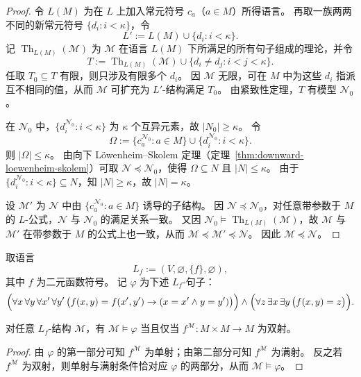 \documentclass[lang=cn,a4paper,newtx,section]{elegantbook}
\begin{document}
 \begin{proof}
 令 $L(M)$ 为在 $L$ 上加入常元符号 $c_a$（$a\in M$）所得语言。
 再取一族两两不同的新常元符号 $\{d_i:i<\kappa\}$，令
 \[
   L':=L(M)\cup\{d_i:i<\kappa\}.
 \]
 记 $\operatorname{Th}_{L(M)}(\mathcal M)$ 为 $\mathcal M$ 在语言 $L(M)$ 下所满足的所有句子组成的理论，并令
 \[
   T:=\operatorname{Th}_{L(M)}(\mathcal M)\cup\{d_i\neq d_j: i<j<\kappa\}.
 \]
 任取 $T_0\subseteq T$ 有限，则只涉及有限多个 $d_i$。
 因 $\mathcal M$ 无限，可在 $M$ 中为这些 $d_i$ 指派互不相同的值，从而 $\mathcal M$ 可扩充为 $L'$-结构满足 $T_0$。
 由紧致性定理，$T$ 有模型 $\mathcal N_0$。

 在 $\mathcal N_0$ 中，$\{d_i^{\mathcal N_0}:i<\kappa\}$ 为 $\kappa$ 个互异元素，故 $\lvert N_0\rvert\ge\kappa$。
 令
 \[
   \Omega:=\{c_a^{\mathcal N_0}:a\in M\}\cup\{d_i^{\mathcal N_0}:i<\kappa\}.
 \]
 则 $\lvert\Omega\rvert\le\kappa$。
 由向下 Löwenheim--Skolem 定理（定理~\ref{thm:downward-loewenheim-skolem}）可取 $\mathcal N\preccurlyeq\mathcal N_0$，使得 $\Omega\subseteq N$ 且 $\lvert N\rvert\le\kappa$。
 由于 $\{d_i^{\mathcal N_0}:i<\kappa\}\subseteq N$，知 $\lvert N\rvert\ge\kappa$，故 $\lvert N\rvert=\kappa$。

 设 $\mathcal M'$ 为 $\mathcal N$ 中由 $\{c_a^{\mathcal N_0}:a\in M\}$ 诱导的子结构。
 因 $\mathcal N\preccurlyeq\mathcal N_0$，对任意带参数于 $M$ 的 $L$-公式，$\mathcal N$ 与 $\mathcal N_0$ 的满足关系一致。
 又因 $\mathcal N_0\models\operatorname{Th}_{L(M)}(\mathcal M)$，故 $\mathcal M$ 与 $\mathcal M'$ 在带参数于 $M$ 的公式上也一致，从而 $\mathcal M\preccurlyeq\mathcal M'\preccurlyeq\mathcal N$。
 因此 $\mathcal M\preccurlyeq\mathcal N$。
 \end{proof}

 取语言
 \[
   L_f:=(V,\varnothing,\{f\},\varnothing),
 \]
 其中 $f$ 为二元函数符号。
 记 $\varphi$ 为下述 $L_f$-句子：
 \[
   \Bigl(\forall x\,\forall y\,\forall x'\,\forall y'\,\bigl(f(x,y)=f(x',y')\rightarrow(x=x'\wedge y=y')\bigr)\Bigr)
   \wedge
   \Bigl(\forall z\,\exists x\,\exists y\,\bigl(f(x,y)=z\bigr)\Bigr).
 \]

 \begin{proposition}
 \label{m2-to-m-sentence}
 对任意 $L_f$-结构 $\mathcal M$，有 $\mathcal M\models\varphi$ 当且仅当 $f^{\mathcal M}:M\times M\to M$ 为双射。
 \end{proposition}

 \begin{proof}
 由 $\varphi$ 的第一部分可知 $f^{\mathcal M}$ 为单射；由第二部分可知 $f^{\mathcal M}$ 为满射。
 反之若 $f^{\mathcal M}$ 为双射，则单射与满射条件恰对应 $\varphi$ 的两部分，从而 $\mathcal M\models\varphi$。
 \end{proof}
\end{document}

